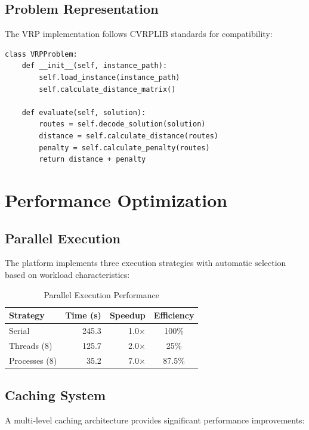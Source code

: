 \documentclass[conference]{IEEEtran}
\begin{document}
\subsection{Problem Representation}

The VRP implementation follows CVRPLIB standards for compatibility:

\begin{lstlisting}[style=pythonstyle, caption={VRP problem class}]
class VRPProblem:
    def __init__(self, instance_path):
        self.load_instance(instance_path)
        self.calculate_distance_matrix()
        
    def evaluate(self, solution):
        routes = self.decode_solution(solution)
        distance = self.calculate_distance(routes)
        penalty = self.calculate_penalty(routes)
        return distance + penalty
\end{lstlisting}

\section{Performance Optimization}
\label{sec:performance}

\subsection{Parallel Execution}

The platform implements three execution strategies with automatic selection based on workload characteristics:

\begin{table}[htbp]
\caption{Parallel Execution Performance}
\label{tab:parallel}
\centering
\begin{tabular}{lrrc}
\toprule
\textbf{Strategy} & \textbf{Time (s)} & \textbf{Speedup} & \textbf{Efficiency} \\
\midrule
Serial & 245.3 & 1.0× & 100\% \\
Threads (8) & 125.7 & 2.0× & 25\% \\
Processes (8) & 35.2 & 7.0× & 87.5\% \\
\bottomrule
\end{tabular}
\end{table}

\subsection{Caching System}

A multi-level caching architecture provides significant performance improvements:
\end{document}

